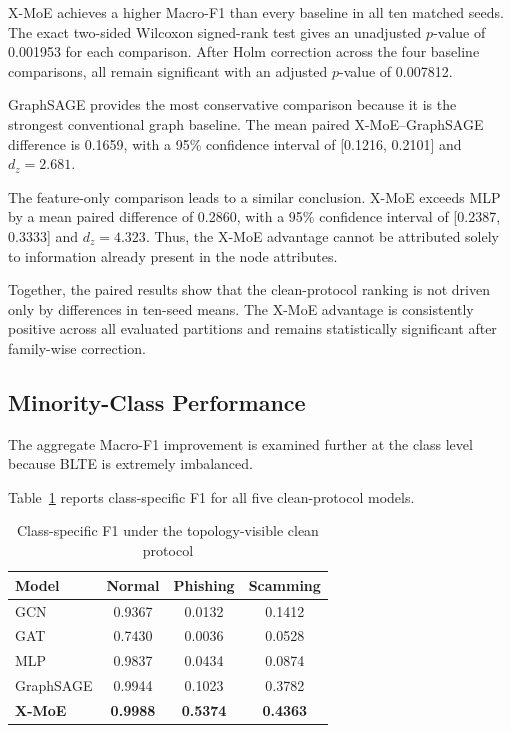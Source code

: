 \documentclass{ieeeaccess}
\begin{document}
X-MoE achieves a higher Macro-F1 than every baseline in all ten matched seeds. The exact two-sided Wilcoxon signed-rank test gives an unadjusted \(p\)-value of 0.001953 for each comparison. After Holm correction across the four baseline comparisons, all remain significant with an adjusted \(p\)-value of 0.007812.

GraphSAGE provides the most conservative comparison because it is the strongest conventional graph baseline. The mean paired X-MoE--GraphSAGE difference is 0.1659, with a 95\% confidence interval of [0.1216, 0.2101] and \(d_z=2.681\).

The feature-only comparison leads to a similar conclusion. X-MoE exceeds MLP by a mean paired difference of 0.2860, with a 95\% confidence interval of [0.2387, 0.3333] and \(d_z=4.323\). Thus, the X-MoE advantage cannot be attributed solely to information already present in the node attributes.

Together, the paired results show that the clean-protocol ranking is not driven only by differences in ten-seed means. The X-MoE advantage is consistently positive across all evaluated partitions and remains statistically significant after family-wise correction.


\subsection{Minority-Class Performance}

The aggregate Macro-F1 improvement is examined further at the class level because BLTE is extremely imbalanced.

Table~\ref{tab:clean_class_results} reports class-specific F1 for all five clean-protocol models.

\begin{table}[t]
\centering
\caption{Class-specific F1 under the topology-visible clean protocol}
\label{tab:clean_class_results}

\renewcommand{\arraystretch}{1.12}
\setlength{\tabcolsep}{4pt}
\scriptsize

\begin{tabular}{lccc}
\toprule
\textbf{Model} &
\textbf{Normal} &
\textbf{Phishing} &
\textbf{Scamming} \\
\midrule

GCN &
0.9367 &
0.0132 &
0.1412 \\

GAT &
0.7430 &
0.0036 &
0.0528 \\

MLP &
0.9837 &
0.0434 &
0.0874 \\

GraphSAGE &
0.9944 &
0.1023 &
0.3782 \\

\textbf{X-MoE} &
\textbf{0.9988} &
\textbf{0.5374} &
\textbf{0.4363} \\

\bottomrule
\end{tabular}
\end{table}
\end{document}

